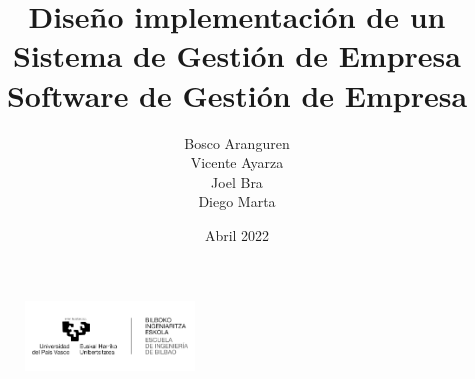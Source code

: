 \documentclass[12pt, letterpaper]{article}
\title{{\myfont Diseño  implementación de un Sistema de Gestión de Empresa\\
\large Software de Gestión de Empresa}}
\author{Bosco Aranguren \\ Vicente Ayarza \\ Joel Bra \\ Diego Marta }
\date{Abril 2022}
\begin{document}
\maketitle
{}

\begin{figure}[b]
\centering
\includegraphics[width=170px]{logo.png}
\end{figure}

\thispagestyle{empty}
\clearpage

\clearpage
\tableofcontents
\clearpage
\listoffigures
\clearpage

\end{document}
